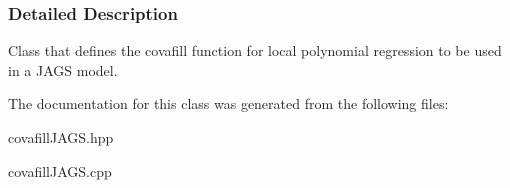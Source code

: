 \subsubsection{Detailed Description}
Class that defines the covafill function for local polynomial regression to be used in a J\+A\+G\+S model. 

The documentation for this class was generated from the following files\+:\begin{DoxyCompactItemize}
\item 
covafill\+J\+A\+G\+S.\+hpp\item 
covafill\+J\+A\+G\+S.\+cpp\end{DoxyCompactItemize}
